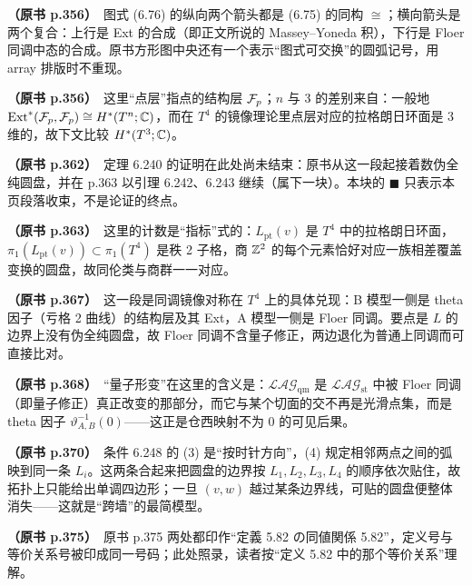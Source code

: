 \noindent \textbf{（原书 p.356）}\ 图式 (6.76) 的纵向两个箭头都是 (6.75) 的同构 $\cong$；横向箭头是两个复合：上行是 Ext 的合成（即正文所说的 Massey–Yoneda 积），下行是 Floer 同调中态的合成。原书方形图中央还有一个表示“图式可交换”的圆弧记号，用 array 排版时不重现。\par\smallskip

\noindent \textbf{（原书 p.356）}\ 这里“点层”指点的结构层 $\mathcal{F}_p$；$n$ 与 $3$ 的差别来自：一般地 $\operatorname{Ext}^*(\mathcal{F}_p,\mathcal{F}_p)\cong H^*(T^n;\mathbb{C})$，而在 $T^4$ 的镜像理论里点层对应的拉格朗日环面是 3 维的，故下文比较 $H^*(T^3;\mathbb{C})$。\par\smallskip

\noindent \textbf{（原书 p.362）}\ 定理 6.240 的证明在此处尚未结束：原书从这一段起接着数伪全纯圆盘，并在 p.363 以引理 6.242、6.243 继续（属下一块）。本块的 $\blacksquare$ 只表示本页段落收束，不是论证的终点。\par\smallskip

\noindent \textbf{（原书 p.363）}\ 这里的计数是“指标”式的：$L_{\mathrm{pt}}(v)$ 是 $T^4$ 中的拉格朗日环面，$\pi_1(L_{\mathrm{pt}}(v))\subset\pi_1(T^4)$ 是秩 2 子格，商 $\mathbb{Z}^2$ 的每个元素恰好对应一族相差覆盖变换的圆盘，故同伦类与商群一一对应。\par\smallskip

\noindent \textbf{（原书 p.367）}\ 这一段是同调镜像对称在 $T^4$ 上的具体兑现：B 模型一侧是 theta 因子（亏格 2 曲线）的结构层及其 Ext，A 模型一侧是 Floer 同调。要点是 $L$ 的边界上没有伪全纯圆盘，故 Floer 同调不含量子修正，两边退化为普通上同调而可直接比对。\par\smallskip

\noindent \textbf{（原书 p.368）}\ “量子形变”在这里的含义是：$\mathcal{LAG}_{\mathrm{qm}}$ 是 $\mathcal{LAG}_{\mathrm{st}}$ 中被 Floer 同调（即量子修正）真正改变的那部分，而它与某个切面的交不再是光滑点集，而是 theta 因子 $\vartheta^{-1}_{A,B}(0)$——这正是仓西映射不为 $0$ 的可见后果。\par\smallskip

\noindent \textbf{（原书 p.370）}\ 条件 6.248 的 (3) 是“按时针方向”，(4) 规定相邻两点之间的弧映到同一条 $L_i$。这两条合起来把圆盘的边界按 $L_1,L_2,L_3,L_4$ 的顺序依次贴住，故拓扑上只能给出单调四边形；一旦 $(v,w)$ 越过某条边界线，可贴的圆盘便整体消失——这就是“跨墙”的最简模型。\par\smallskip

\noindent \textbf{（原书 p.375）}\ 原书 p.375 两处都印作“定義 5.82 の同値関係 5.82”，定义号与等价关系号被印成同一号码；此处照录，读者按“定义 5.82 中的那个等价关系”理解。\par\smallskip

